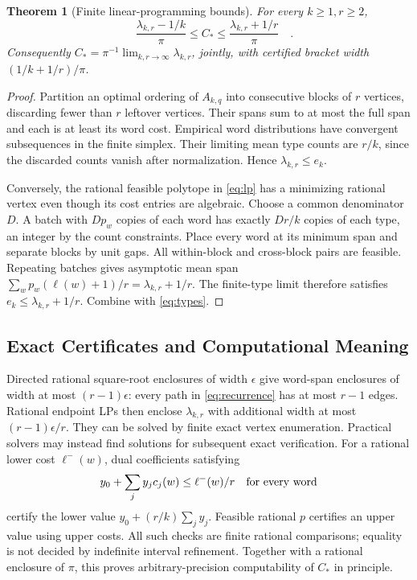\documentclass[11pt,letterpaper]{article}
\newtheorem{theorem}{Theorem}
\theoremstyle{definition}\newtheorem{definition}[theorem]{Definition}
\theoremstyle{remark}\newtheorem{remark}[theorem]{Remark}
\newcommand{\CC}{C_\ast}
\begin{document}
\begin{theorem}[Finite linear-programming bounds]\label{thm:lp}
For every $k\ge1,r\ge2$,
\begin{equation}\label{eq:effective}
 \boxed{\quad\frac{\lambda_{k,r}-1/k}{\pi}\le\CC
 \le\frac{\lambda_{k,r}+1/r}{\pi}\quad}.
\end{equation}
Consequently $\CC=\pi^{-1}\lim_{k,r\to\infty}\lambda_{k,r}$, jointly,
with certified bracket width $(1/k+1/r)/\pi$.
\end{theorem}
\begin{proof}
Partition an optimal ordering of $A_{k,q}$ into consecutive blocks of
$r$ vertices, discarding fewer than $r$ leftover vertices. Their spans
sum to at most the full span and each is at least its word cost.
Empirical word distributions have convergent subsequences in the finite
simplex. Their limiting mean type counts are $r/k$, since the discarded
counts vanish after normalization. Hence $\lambda_{k,r}\le e_k$.

Conversely, the rational feasible polytope in \eqref{eq:lp} has a minimizing
rational vertex even though its cost entries are algebraic. Choose a
common denominator $D$. A batch with $Dp_w$ copies of each word has
exactly $Dr/k$ copies of each type, an integer by the count constraints.
Place every word at its minimum span and separate blocks by unit gaps.
All within-block and cross-block pairs are feasible. Repeating batches
gives asymptotic mean span
$\sum_w p_w(\ell(w)+1)/r=\lambda_{k,r}+1/r$.
The finite-type limit therefore satisfies
$e_k\le\lambda_{k,r}+1/r$. Combine with \eqref{eq:types}.
\end{proof}

\subsection{Exact Certificates and Computational Meaning}
Directed rational square-root enclosures of width $\epsilon$ give
word-span enclosures of width at most $(r-1)\epsilon$: every path in
\eqref{eq:recurrence} has at most $r-1$ edges. Rational endpoint LPs
then enclose $\lambda_{k,r}$ with additional width at most
$(r-1)\epsilon/r$. They can be solved by finite exact vertex enumeration.
Practical solvers may instead find solutions for subsequent exact verification.
For a rational lower cost $\ell^-(w)$, dual coefficients satisfying
\[
 y_0+\sum_j y_jc_j(w)\le\ell^-(w)/r\quad\hbox{for every word}
\]
certify the lower value $y_0+(r/k)\sum_jy_j$. Feasible rational $p$
certifies an upper value using upper costs. All such checks are finite
rational comparisons; equality is not decided by indefinite interval
refinement. Together with a rational enclosure of $\pi$, this proves
arbitrary-precision computability of $\CC$ in principle.
\end{document}
